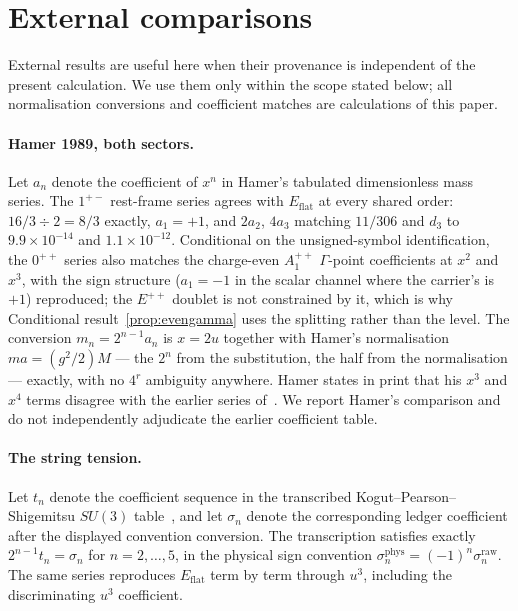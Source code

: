 \documentclass[11pt]{article}
\theoremstyle{plain}
\theoremstyle{definition}
\theoremstyle{remark}
\newcommand{\chk}[1]{}
\begin{document}
\section{External comparisons}
\label{sec:external}

External results are useful here when their provenance is independent of the
present calculation. We use them only within the scope stated below; all
normalisation conversions and coefficient matches are calculations of this
paper.

\paragraph{Hamer 1989, both sectors.} Let $a_n$ denote the coefficient of
$x^n$ in Hamer's tabulated dimensionless mass series. The $1^{+-}$ rest-frame series agrees
with $E_{\mathrm{flat}}$ at every shared order: $16/3\div2=8/3$ exactly,
$a_1=+1$, and $2a_2$, $4a_3$ matching $11/306$ and $d_3$ to $9.9\times10^{-14}$
and $1.1\times10^{-12}$. Conditional on the unsigned-symbol identification,
the $0^{++}$ series also matches the charge-even $A_1^{++}$ $\Gamma$-point
coefficients at $x^2$ and $x^3$, with the sign structure ($a_1=-1$ in the
scalar channel where the carrier's is $+1$) reproduced; the $E^{++}$ doublet is
not constrained by it, which is why Conditional result~\ref{prop:evengamma}
uses the splitting rather than the level. The conversion
$m_n=2^{n-1}a_n$ is $x=2u$ together
with Hamer's normalisation $ma=(g^2/2)M$ --- the $2^n$ from the substitution,
the half from the normalisation --- exactly, with no $4^r$ ambiguity anywhere.
Hamer states in print that his $x^3$ and $x^4$ terms disagree with the earlier
series of~\cite{KSS1976}. We report Hamer's comparison and do not independently
adjudicate the earlier coefficient table.
\chk{Hamer's 1+- series matches the C-odd Gamma-point coefficients through x\^{}3}
\chk{Hamer's 0++ series matches the C-even Gamma-point coefficients through x\^{}3}
\chk{the m\_n = 2\^{}(n-1) a\_n bridge is the x = 2u conversion}
\chk{the Hamer table is pinned, and the a\_4 agreement is primary-source}

\paragraph{The string tension.} Let $t_n$ denote the coefficient sequence in
the transcribed Kogut--Pearson--Shigemitsu $SU(3)$ table~\cite{KPS1981}, and
let $\sigma_n$ denote the corresponding ledger coefficient after the displayed
convention conversion. The transcription satisfies exactly
$2^{n-1}t_n=\sigma_n$ for $n=2,\dots,5$, in the physical sign convention
$\sigma_n^{\mathrm{phys}}=(-1)^n\sigma_n^{\mathrm{raw}}$. The same series
reproduces $E_{\mathrm{flat}}$ term by term through $u^3$, including the
discriminating $u^3$ coefficient.
\chk{the KPS 1980 string-tension table equals the certified sigma series EXACTLY}
\chk{sigma\_n\^{}phys = (-1)\^{}n sigma\_n\^{}raw, and C5 is the n = 3 case}
\chk{the ratio and sigma series reproduce E\_flat exactly}
\end{document}
